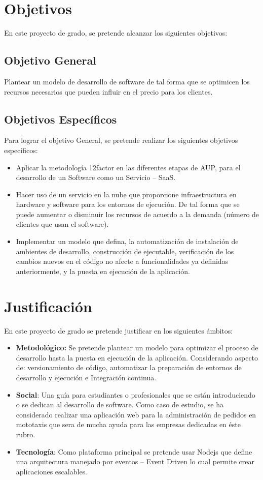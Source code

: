 \section{Objetivos}
\noindent En este proyecto de grado, se pretende alcanzar los siguientes objetivos:

\subsection{Objetivo General}

\noindent Plantear un modelo de desarrollo de software de tal forma que se optimicen los recursos necesarios que pueden influir en el precio para los clientes. 


\subsection{Objetivos Específicos}

\noindent Para lograr el objetivo General, se pretende realizar los siguientes objetivos específicos:
\begin{itemize}
  \item Aplicar la metodología 12factor en las diferentes etapas de AUP, para el desarrollo de un Software como un Servicio – SaaS.
  \item Hacer uso de un servicio en la nube que proporcione  infraestructura en hardware y software para los entornos de ejecución. De tal forma que se puede aumentar o disminuir los recursos de acuerdo a la demanda (número de clientes que usan el software).
  \item Implementar un modelo que defina, la automatización de instalación de ambientes de desarrollo, construcción de ejecutable, verificación de los cambios nuevos en el código no afecte a funcionalidades ya definidas anteriormente, y la puesta en ejecución de la aplicación.
\end{itemize}

\section{Justificación}
\noindent En este proyecto de grado se pretende justificar en los siguientes ámbitos:
\begin{itemize}
  \item \textbf{Metodológico:} Se pretende plantear un modelo para optimizar el proceso de desarrollo hasta la puesta en ejecución de la aplicación. Considerando aspecto de: versionamiento de código, automatizar la preparación de entornos de desarrollo y ejecución e Integración continua.
  \item \textbf{Social}: Una guía para estudiantes o profesionales que se están introduciendo o se dedican al desarrollo de software. Como caso de estudio, se ha considerado realizar una aplicación web para la administración de pedidos en mototaxis que sera de mucha ayuda para las empresas dedicadas en  éste rubro.
  \item \textbf{Tecnología}: Como plataforma principal se pretende usar Nodejs que define una arquitectura manejado por eventos – Event Driven lo cual permite crear aplicaciones escalables.
\end{itemize}

